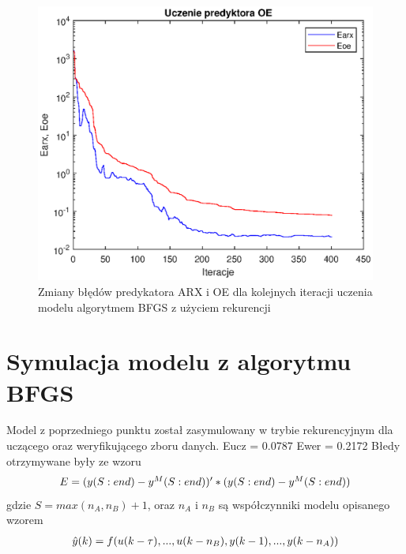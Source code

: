 		\begin{figure}[h!]
			\centering
			\includegraphics[width=\linewidth]{img/BFGS_OE_p.eps}
			\caption{Zmiany błędów predykatora ARX i OE dla kolejnych iteracji uczenia modelu algorytmem BFGS z użyciem rekurencji}
			\label{fig:bfgs_oe_p}
		\end{figure}
		
		\newpage
	\section{Symulacja modelu z algorytmu BFGS}
		\label{sec:bfgs_sym}
		Model z poprzedniego punktu został zasymulowany w trybie rekurencyjnym dla uczącego oraz weryfikującego zboru danych.
		Eucz = 0.0787
		Ewer = 0.2172
		Błedy otrzymywane były ze wzoru
		\begin{equation}
		\begin{tabular}{l}
		$E = (y(S:end)-y^M(S:end))'*(y(S:end)-y^M(S:end))$
		\end{tabular}
		\label{eq:error}
		\end{equation}
		gdzie $S = max(n_A,n_B)+1$, oraz $n_A$ i $n_B$ są współczynniki modelu opisanego wzorem
		\begin{equation}
		\begin{tabular}{l}
		$\hat{y}(k)=f(u(k-\tau),...,u(k-n_B),y(k-1),...,y(k-n_A))$
		\end{tabular}
		\label{eq:model_wzor}
		\end{equation}
		
